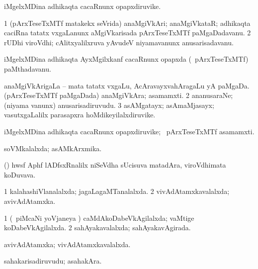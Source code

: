\bentry
{}
\gl{\nA}
\bmng
iMgelxMDina adhikaqta cacaRnunx opapxdiruvike. 
\emng
\eentry

\bentry
{}
\gl{\nA}
\bmng
\bnum
\num{1} (pArxTeseTxMTf matakekx seVrida) anaMgiVkAri; anaMgiVkataR; adhikaqta caciRna tatatx vxgaLanunx aMgiVkarisada pArxTeseTxMTf paMgaDadavanu. 
\num{2} rUDhi viroVdhi; cAlitxyalilxruva yAvudeV niyamavanunx anusarisadavanu. 
\enum
\emng
\eentry

\bentry
{}
\gl{\nA}
\bmng
iMgelxMDina adhikaqta AyxMgilxkanf cacaRnunx opapxda (\sA\ pArxTeseTxMTf) paMthadavanu. 
\emng
\eentry

\bentry
{}
\gl{\nA}
\bmng
\bnum
{}  
\banum
{} anaMgiVkArigaLa -- mata tatatx vxgaLu, AcAravayxvahAragaLu yA paMgaDa. 
 (pArxTeseTxMTf paMgaDada) anaMgiVkAra; asamamxti. 
\eanum
\numie
\num{2} ananusaraNe; (niyama \mo vanunx) anusarisadiruvudu. 
\num{3} asAMgatayx; asAmaMjasayx; vasutxgaLalilx parasapxra hoMdikeyilalxdiruvike. 
\enum
\emng
\eentry

\bentry
{}
\gl{\nA}
\bmng
iMgelxMDina adhikaqta cacaRnunx opapxdiruvike; \kanmu\ pArxTeseTxMTf asamamxti. 
\emng
\eentry

\bentry
{}
\gl{\gu}
\bmng
soVMkalalxda; asAMkArxmika. 
\emng
\eentry

\bentry
{}
\gl{\nA}
\bmng
(\birx) hwsf Aphf lADfsxRnalilx niSeVdha sUcisuva matadAra, viroVdhimata koDuvava. 
\emng
\eentry

\bentry
{}
\gl{\gu}
\bmng
\bnum
\num{1} kalahashiVlanalalxda; jagaLagaMTanalalxda. 
\num{2} vivAdAtamxkavalalxda; avivAdAtamxka. 
\enum
\emng
\eentry

\bentry
{}
\gl{\gu}
\bmng
\bnum
\num{1} (\kanmu\ piMcaNi yoVjaneya \vi) caMdAkoDabeVkAgilalxda; vaMtige koDabeVkAgilalxda. 
\num{2} sahAyakavalalxda; sahAyakavAgirada. 
\enum
\emng
\eentry

\bentry
{}
\gl{\gu}
\bmng
avivAdAtamxka; vivAdAtamxkavalalxda. 
\emng
\eentry

\bentry
{}
\gl{\nA}
\bmng
sahakarisadiruvudu; asahakAra. 
\emng
\eentry

